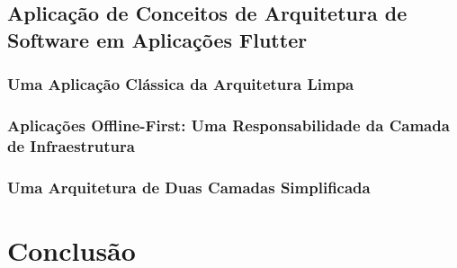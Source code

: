 \documentclass[12pt, %
openright, 
oneside, %
a4paper,    %
brazil]{facom-ufu-abntex2}
\begin{document}
\section{Aplicação de Conceitos de Arquitetura de Software em Aplicações Flutter}


\subsection{Uma Aplicação Clássica da Arquitetura Limpa}

\subsection{Aplicações Offline-First: Uma Responsabilidade da Camada de Infraestrutura}

\subsection{Uma Arquitetura de Duas Camadas Simplificada}

\chapter{Conclusão}

\postextual



\end{document}
